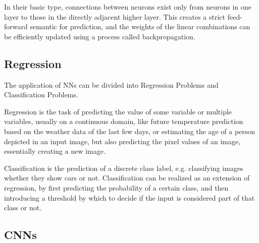 In their basic type, connections between neurons exist only from neurons in one layer to those in the directly adjacent higher layer. This creates a strict feed-forward semantic for prediction, and the weights of the linear combinations can be efficiently updated using a process called backpropagation.

\pagebreak

\subsection{Regression}

The application of \glspl{NN} can be divided into Regression Problems and Classification Problems. 

Regression is the task of predicting the value of some variable or multiple variables, usually on a continuous domain, like future temperature prediction based on the weather data of the last few days, or estimating the age of a person depicted in an input image, but also predicting the pixel values of an image, essentially creating a new image.

Classification is the prediction of a discrete class label, e.g. classifying images whether they show cars or not. Classification can be realized as an extension of regression, by first predicting the probability of a certain class, and then introducing a threshold by which to decide if the input is considered part of that class or not.

\subsection{\glspl{CNN}}

